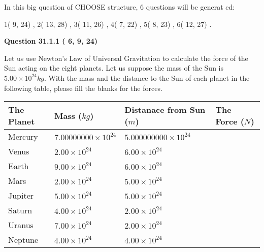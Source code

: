 \documentclass[12pt]{article}
\begin{document}
   
\vspace{0.2in}
   
 In this big question of CHOOSE structure,           6 questions will be generat
 ed: 
  
  
            1(          9,         24)
 ,
            2(         13,         28)
 ,
            3(         11,         26)
 ,
            4(          7,         22)
 ,
            5(          8,         23)
 ,
            6(         12,         27)
 .
  
\vspace{0.2in}
  
{\textbf{\Large{Question
31.1.1 
 (          6,          9,         24)
}}}
  
  
Let us use Newton's Law of Universal Gravitation to calculate the force
of the Sun acting on the eight planets. Let us suppose the mass of the
Sun is $ %
5.00 \times 10^{24} kg$. With the mass and the
distance to the Sun of each planet in the following table, please fill
the blanks for the forces.
 
\vspace{0.2in}
 
 
\begin{tabular}{|l|l|l|l|}
\hline
The Planet & Mass ($kg$) & Distanace from Sun ($m$) & The Force ($N$)\\
\hline
Mercury  &
           $ %
7.00000000 \times 10^{24} $   &
             $ %
5.000000000 \times 10^{24} $    &
\\  \hline
Venus    &
           $ %
2.00 \times 10^{24} $    &
             $ %
6.00 \times 10^{24} $    &
\\  \hline
Earth    &
           $ %
9.00 \times 10^{24} $    &
             $ %
6.00 \times 10^{24} $    &
\\   \hline
Mars     &
           $ %
2.00 \times 10^{24} $    &
             $ %
5.00 \times 10^{24} $    &
\\   \hline
Jupiter  &
           $ %
5.00 \times 10^{24} $    &
             $ %
5.00 \times 10^{24} $    &
\\  \hline
Saturn   &
           $ %
4.00 \times 10^{24}$    &
             $ %
2.00 \times 10^{24}$    &
\\  \hline
Uranus   &
           $ %
7.00 \times 10^{24} $    &
             $ %
2.00 \times 10^{24} $    &
\\  \hline
Neptune  &
           $ %
4.00 \times 10^{24} $    &
             $ %
4.00 \times 10^{24} $    &
\\  \hline
 
\end{tabular}
 
\end{document}
